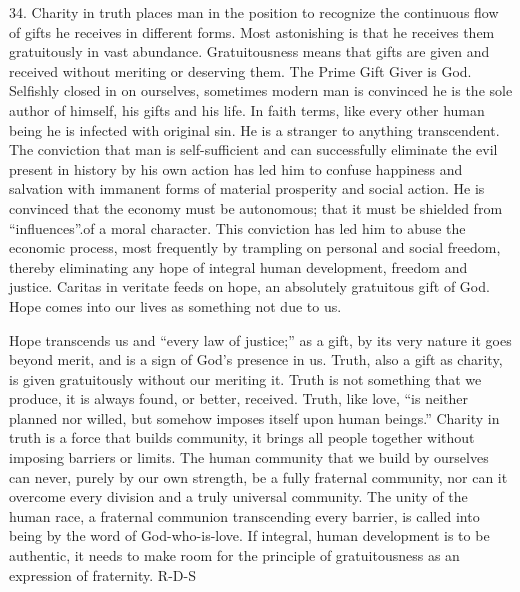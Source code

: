 \documentclass[oneside]{book}
\begin{document}
34. Charity in truth places man in the position to recognize the continuous flow
of gifts he receives in different forms. Most astonishing is that he receives
them gratuitously in vast abundance. Gratuitousness means that gifts are given
and received without meriting or deserving them. The Prime Gift Giver is
God. Selfishly closed in on ourselves, sometimes modern man is convinced he is
the sole author of himself, his gifts and his life. In faith terms, like every
other human being he is infected with original sin. He is a stranger to anything
transcendent. The conviction that man is self-sufficient and can successfully
eliminate the evil present in history by his own action has led him to confuse
happiness and salvation with immanent forms of material prosperity and social
action. He is convinced that the economy must be autonomous; that it must be
shielded from ``influences''.of a moral character. This conviction has led him
to abuse the economic process, most frequently by trampling on personal and
social freedom, thereby eliminating any hope of integral human development,
freedom and justice. Caritas in veritate feeds on hope, an absolutely gratuitous
gift of God. Hope comes into our lives as something not due to us.

Hope transcends us and ``every law of justice;'' as a gift, by its very nature
it goes beyond merit, and is a sign of God's presence in us. Truth, also a gift
as charity, is given gratuitously without our meriting it. Truth is not
something that we produce, it is always found, or better, received. Truth, like
love, ``is neither planned nor willed, but somehow imposes itself upon human
beings.'' Charity in truth is a force that builds community, it brings all
people together without imposing barriers or limits. The human community that we
build by ourselves can never, purely by our own strength, be a fully fraternal
community, nor can it overcome every division and a truly universal
community. The unity of the human race, a fraternal communion transcending every
barrier, is called into being by the word of God-who-is-love. If integral, human
development is to be authentic, it needs to make room for the principle of
gratuitousness as an expression of fraternity.
R-D-S
\end{document}
